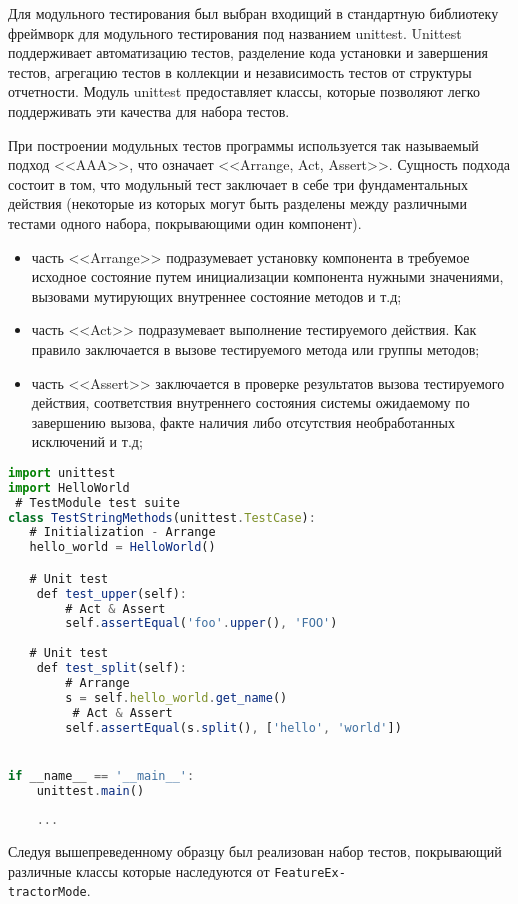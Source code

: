 Для модульного тестирования был выбран входищий в стандартную библиотеку фреймворк для модульного тестирования под названием unittest. Unittest поддерживает автоматизацию тестов, разделение кода установки и завершения тестов, агрегацию тестов в коллекции и независимость тестов от структуры отчетности. Модуль unittest предоставляет классы, которые позволяют легко поддерживать эти качества для набора тестов.

При построении модульных тестов программы используется так называемый подход <<AAA>>, что означает <<Arrange, Act, Assert>>. Сущность подхода состоит в том, что модульный тест заключает в себе три фундаментальных действия (некоторые из которых могут быть разделены между различными тестами одного набора, покрывающими один компонент).

\begin{itemize}
\item{часть <<Arrange>> подразумевает установку компонента в требуемое исходное состояние путем инициализации компонента нужными значениями, вызовами мутирующих внутреннее состояние методов и т.д;}
\item{часть <<Act>> подразумевает выполнение тестируемого действия. Как правило заключается в вызове тестируемого метода или группы методов;}
\item{часть <<Assert>> заключается в проверке результатов вызова тестируемого действия, соответствия внутреннего состояния системы ожидаемому по завершению вызова, факте наличия либо отсутствия необработанных исключений и т.д;}
\end{itemize}

\begin{lstlisting}[language=TypeScript, label=lst:testing:sample]
import unittest
import HelloWorld
 # TestModule test suite
class TestStringMethods(unittest.TestCase):
   # Initialization - Arrange
   hello_world = HelloWorld()

   # Unit test
    def test_upper(self):
        # Act & Assert
        self.assertEqual('foo'.upper(), 'FOO')
        
   # Unit test
    def test_split(self):
        # Arrange
        s = self.hello_world.get_name()
         # Act & Assert
        self.assertEqual(s.split(), ['hello', 'world'])


if __name__ == '__main__':
    unittest.main()
        
    ...
\end{lstlisting}

Следуя вышепреведенному образцу был реализован набор тестов, покрывающий различные классы которые наследуются от \texttt{FeatureEx-} \\ \texttt{tractorMode}.


